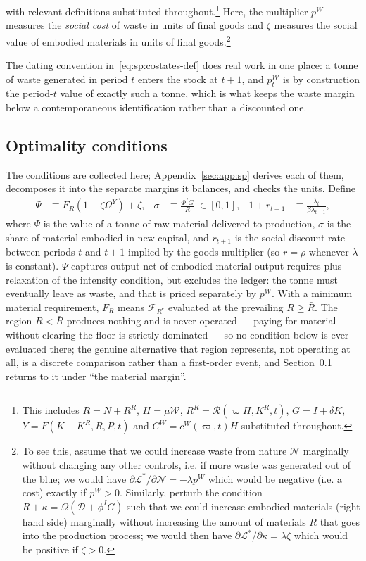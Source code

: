 with relevant definitions substituted throughout.\footnote{This includes $R=N+R^R$, $H=\mu\mathcal W$, $R^R=\mathcal R\left(\varpi H,K^R,t\right)$, $G=I+\delta K$, $Y=F\left(K-K^R,R,P,t\right)$
and $C^W=c^W\!\left(\varpi,t\right)H$ substituted throughout.} Here, the multiplier $p^W$ measures the \textit{social cost} of waste in units of final goods and $\zeta$ measures the social value of embodied materials in units of final goods.\footnote{To see this, assume that we could increase waste from nature $\mathcal{N}$ marginally without changing any other controls, i.e. if more waste was generated out of the blue; we would have $\partial \mathcal L^*/\partial \mathcal N = - \lambda p^W$ which would be negative (i.e. a cost) exactly if $p^W>0$. Similarly, perturb the condition $R + \kappa = \Omega \left(\mathcal{D}+\phi^IG\right)$ such that we could increase embodied materials (right hand side) marginally without increasing the amount of materials $R$ that goes into the production process; we would then have $\partial \mathcal L^*/\partial \kappa = \lambda \zeta$ which would be positive if $\zeta>0$.}

The dating convention in~\eqref{eq:sp:costates-def} does real work in one place: a tonne of waste generated in period $t$ enters the stock at $t+1$, and $p^{\mathcal W}_t$ is by construction the period-$t$ value of exactly such a tonne, which is what keeps the waste margin below a contemporaneous identification rather than a discounted one.



\subsection{Optimality conditions}\label{sec:sp:opt:foc}

The conditions are collected here; Appendix~\ref{sec:app:sp} derives each of them, decomposes it into the separate margins it balances, and checks the units. Define
\begin{align}
\Psi &\equiv F_R\left(1-\zeta\Omega^Y\right)+\zeta,
&
\sigma &\equiv \frac{\Phi^IG}{R}\;\in\left[0,1\right],
&
1+r_{t+1} &\equiv \frac{\lambda_t}{\beta\lambda_{t+1}},
\label{eq:sp:shorthand}
\end{align}
where $\Psi$ is the value of a tonne of raw material delivered to production, $\sigma$ is the share of material embodied in new capital, and $r_{t+1}$ is the social discount rate between periods $t$ and $t+1$ implied by the goods multiplier (so $r=\rho$ whenever $\lambda$ is constant). $\Psi$ captures output net of embodied material output requires plus relaxation of the intensity condition, but excludes the ledger: the tonne must eventually leave as waste, and that is priced separately by $p^W$. With a minimum material requirement, $F_R$ means $\mathcal F_{R^e}$ evaluated at the prevailing $R\ge\bar R$. The region $R<\bar R$ produces nothing and is never operated --- paying for material without clearing the floor is strictly dominated --- so no condition below is ever evaluated there; the genuine alternative that region represents, not operating at all, is a discrete comparison rather than a first-order event, and Section~\ref{sec:sp:opt:foc} returns to it under ``the material margin''.

